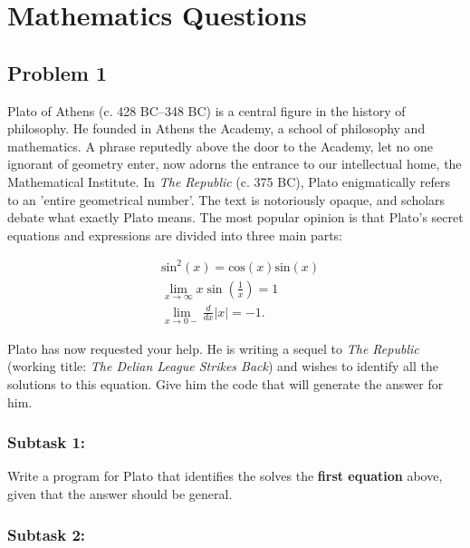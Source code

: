 \documentclass[12pt]{article}
\begin{document}
\newpage
\section{Mathematics Questions}
\subsection{Problem 1}
Plato of Athens (c. 428 BC--348 BC) is a central figure in the history of philosophy. He founded in Athens the Academy, a school of philosophy and mathematics. A phrase reputedly above the door to the Academy, let no one ignorant of geometry enter, now adorns the entrance to our intellectual home, the Mathematical Institute.
\vspace{1em}
In \textit{The Republic} (c. 375 BC), Plato enigmatically refers to an 'entire geometrical number'. The text is notoriously opaque, and scholars debate what exactly Plato means. The most popular opinion is that Plato's secret equations and expressions are divided into three main parts:

\begin{align}
    &\mathrm{sin}^2(x) = \mathrm{cos}(x)\mathrm{sin}(x) \\    
    &\lim_{x \to \infty} x \sin \left(\frac{1}{x}\right) = 1 \\
    &\lim_{x \to 0-} \frac{d}{dx} |x| = -1. 
\end{align}

\vspace{0.5em}

Plato has now requested your help. He is writing a sequel to \textit{The Republic} (working title: \textit{The Delian League Strikes Back}) and wishes to identify all the solutions to this equation. Give him the code that will generate the answer for him.

\subsubsection*{\textbf{Subtask 1:}} 

Write a program for Plato that identifies the solves the \textbf{first equation} above, given that the answer should be general.
            \vspace{1em}

    
    \subsubsection*{\textbf{Subtask 2:}} 
    
\end{document}
